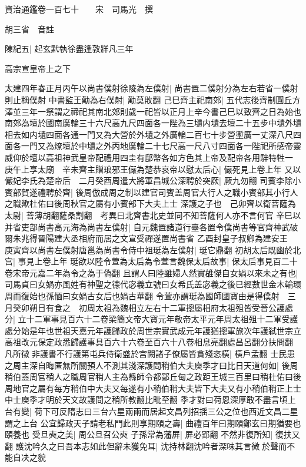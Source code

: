 資治通鑑卷一百七十　　宋　司馬光　撰

胡三省　音註

陳紀五|{
	起玄黓執徐盡逢敦牂凡三年}


高宗宣皇帝上之下

太建四年春正月丙午以尚書僕射徐陵為左僕射|{
	尚書置二僕射分為左右若省一僕射則止稱僕射}
中書監王勱為右僕射|{
	勱莫敗翻}
己巳齊主祀南郊|{
	五代志後齊制圓丘方澤並三年一祭謂之禘祀其南北郊則歲一祀皆以正月上辛今書己巳以致齊之日為始也南郊為壇於國南廣輪三十六尺高九尺四面各一陛為三壝内壝去壇二十五步中壝外壝相去如内壝四面各通一門又為大營於外壝之外廣輪二百七十步營壍廣一丈深八尺四面各一門又為燎壇於中壝之外丙地廣輪二十七尺高一尺八寸四面各一陛祀所感帝靈威仰於壇以高祖神武皇帝配禮用四圭有邸幣各如方色其上帝及配帝各用騂特牲一}
庚午上享太廟　辛未齊主贈琅邪王儼為楚恭哀帝以慰太后心|{
	儼死見上卷上年}
又以儼妃李氏為楚帝后　二月癸酉周遣大將軍昌城公深聘於突厥|{
	厥九勿翻}
司賓李除小賓部賀遂禮聘於齊|{
	後周倣成周之制以建官司賓盖周官大行人之職小賓部其小行人之職歟杜佑曰後周秋官之屬有小賓部下大夫上士}
深護之子也　己卯齊以衛菩薩為太尉|{
	菩薄胡翻薩桑割翻　考異曰北齊書北史並同不知菩薩何人亦不言何官}
辛巳以并省吏部尚書高元海為尚書左僕射|{
	自元魏置諸道行臺各置令僕尚書等官齊神武破爾朱兆得晉陽建大丞相府而居之文宣受禪遂置尚書省}
乙酉封皇子叔卿為建安王　庚寅齊以尚書左僕射唐邕為尚書令侍中祖珽為左僕射|{
	珽它鼎翻}
初胡太后既幽於北宫|{
	事見上卷上年}
珽欲以陸令萱為太后為令萱言魏保太后故事|{
	保太后事見百二十卷宋帝元嘉二年為令之為于偽翻}
且謂人曰陸雖婦人然實䧺傑自女媧以來未之有也|{
	司馬貞曰女媧亦風姓有神聖之德代宓羲立號曰女希氏盖宓羲之後已經數世金木輪環周而復始也孫愐曰女媧古女后也媧古華翻}
令萱亦謂珽為國師國寶由是得僕射　三月癸卯朔日有食之　初周太祖為魏相立左右十二軍摠屬相府太祖殂皆受晉公護處分|{
	立十二軍事見百六十二卷梁簡文帝大寶元年敬帝太平元年周太祖殂十二軍受護處分始是年也世祖天嘉元年護歸政於周世宗實武成元年護猶摠軍旅次年護弑世宗立高祖改元保定政悉歸護事具百六十六卷至百六十八卷相息亮翻處昌呂翻分扶問翻}
凡所徵非護書不行護第屯兵侍衛盛於宫闕諸子僚屬皆貪殘恣橫|{
	橫戶孟翻}
士民患之周主深自晦匿無所關預人不測其淺深護問稍伯大夫庾季才曰比日天道何如|{
	後周稍伯蓋周官稍人之職周官稍人主為縣師令都鄙丘甸之政距王城三百里曰稍杜佑曰後周地官之屬有每方稍伯中大夫又每遂有小稍伯稍大夫皆下大夫又有小稍伯稍正上士中士庾季才明於天文故護問之稍所教翻比毗至翻}
季才對曰荷恩深厚敢不盡言頃上台有變|{
	荷下可反隋志曰三台六星兩兩而居起文昌列招揺三公之位也西近文昌二星謂之上台}
公宜歸政天子請老私門此則享期頤之壽|{
	曲禮百年曰期頤鄭玄曰期猶要也頤養也}
受旦奭之美|{
	周公旦召公奭}
子孫常為藩屏|{
	屏必郢翻}
不然非復所知|{
	復扶又翻}
護沈吟久之曰吾本志如此但辭未獲免耳|{
	沈持林翻沈吟者深味其言微於聲而不能自决之貌}
